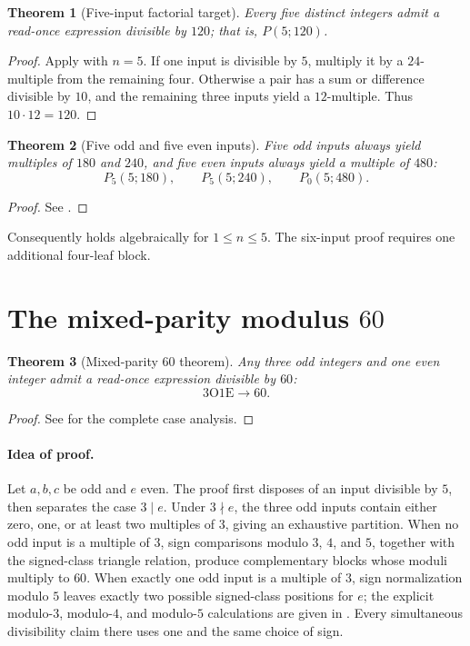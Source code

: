 \documentclass[11pt]{amsart}
\newtheorem{theorem}{Theorem}[section]
\theoremstyle{definition}
\theoremstyle{remark}
\newcommand{\OO}{\mathrm O}
\newcommand{\EE}{\mathrm E}
\begin{document}
\begin{theorem}[Five-input factorial target]\label{thm:five120}
Every five distinct integers admit a read-once expression divisible by
$120$; that is, $P(5;120)$.
\end{theorem}
\begin{proof}
Apply  with $n=5$.  If one input is divisible by $5$,
multiply it by a $24$-multiple from the remaining four.  Otherwise a pair
has a sum or difference divisible by $10$, and the remaining three inputs
yield a $12$-multiple.  Thus $10\cdot12=120$.
\end{proof}

\begin{theorem}[Five odd and five even inputs]\label{thm:fiveparity}
Five odd inputs always yield multiples of $180$ and $240$, and five even
inputs always yield a multiple of $480$:
\[
 P_5(5;180),\qquad P_5(5;240),\qquad P_0(5;480).
\]
\end{theorem}
\begin{proof}
See .
\end{proof}

Consequently  holds algebraically for $1\le n\le5$.
The six-input proof requires one additional four-leaf block.

\section{The mixed-parity modulus \texorpdfstring{$60$}{60}}

\begin{theorem}[Mixed-parity $60$ theorem]\label{thm:3o1e60}
Any three odd integers and one even integer admit a read-once expression
divisible by $60$:
\[
 3\OO1\EE\to60.
\]
\end{theorem}
\begin{proof}
See  for the complete case analysis.
\end{proof}

\paragraph{Idea of proof.}
Let $a,b,c$ be odd and $e$ even.  The proof first disposes of an input
divisible by $5$, then separates the case $3\mid e$.  Under
$3\nmid e$, the three odd inputs contain either zero, one, or at least two
multiples of $3$, giving an exhaustive partition.  When no odd input is a
multiple of $3$, sign comparisons modulo $3$, $4$, and $5$, together with
the signed-class triangle relation, produce complementary blocks whose
moduli multiply to $60$.  When exactly one odd input is a multiple of $3$,
sign normalization modulo $5$ leaves exactly two possible signed-class
positions for $e$; the explicit modulo-$3$, modulo-$4$, and modulo-$5$
calculations are given in .  Every simultaneous
divisibility claim there uses one and the same choice of sign.
\end{document}
